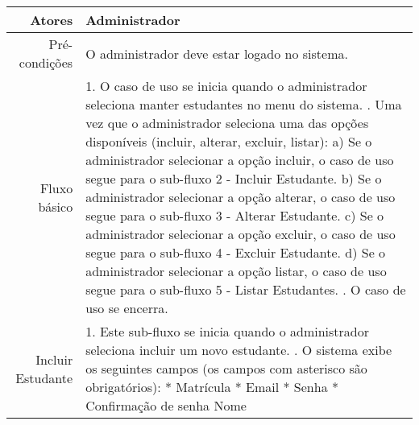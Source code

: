 \begin{longtable}{r p{12cm}}
\hline
Atores & Administrador \\ \hline
Pré-condições & O administrador deve estar logado no sistema.\\ \hline
Fluxo básico & 1. O caso de uso se inicia quando o administrador seleciona manter estudantes no menu do sistema. \newline
                2. Uma vez que o administrador seleciona uma das opções disponíveis (incluir, alterar, excluir, listar): \newline
                \hspace*{1cm} a) Se o administrador selecionar a opção incluir, o caso de uso segue para o sub-fluxo 2 - Incluir Estudante. \newline 
                \hspace*{1cm} b) Se o administrador selecionar a opção alterar, o caso de uso segue para o sub-fluxo 3 - Alterar Estudante.  \newline 
                \hspace*{1cm} c) Se o administrador selecionar a opção excluir, o caso de uso segue para o sub-fluxo 4 - Excluir Estudante.  \newline 
                \hspace*{1cm} d) Se o administrador selecionar a opção listar, o caso de uso segue para o sub-fluxo 5 - Listar Estudantes.  \newline 
                3. O caso de uso se encerra. \newline \\
Incluir Estudante & 1. Este sub-fluxo se inicia quando o administrador seleciona incluir um novo estudante. \newline
                    2. O sistema exibe os seguintes campos (os campos com asterisco são obrigatórios): \newline
                    \hspace*{1cm} * Matrícula \newline
                    \hspace*{1cm} * Email \newline
                    \hspace*{1cm} * Senha \newline
                    \hspace*{1cm} * Confirmação de senha \newline
                    \hspace*{1cm} Nome \newline

\end{longtable}
